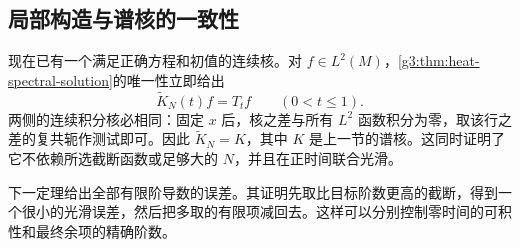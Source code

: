 \subsection{局部构造与谱核的一致性}
\label{g3:subsec:1602:05}
现在已有一个满足正确方程和初值的连续核。对 \(f\in L^2(M)\)，\cref{g3:thm:heat-spectral-solution}的唯一性立即给出
\[
	\widetilde K_N(t)f=T_tf\qquad(0<t\le1).
\]
两侧的连续积分核必相同：固定 \(x\) 后，核之差与所有 \(L^2\) 函数积分为零，取该行之差的复共轭作测试即可。因此 \(\widetilde K_N=K\)，其中 \(K\) 是上一节的谱核。这同时证明了它不依赖所选截断函数或足够大的 \(N\)，并且在正时间联合光滑。

\ProseParagraphBreak

下一定理给出全部有限阶导数的误差。其证明先取比目标阶数更高的截断，得到一个很小的光滑误差，然后把多取的有限项减回去。这样可以分别控制零时间的可积性和最终余项的精确阶数。

